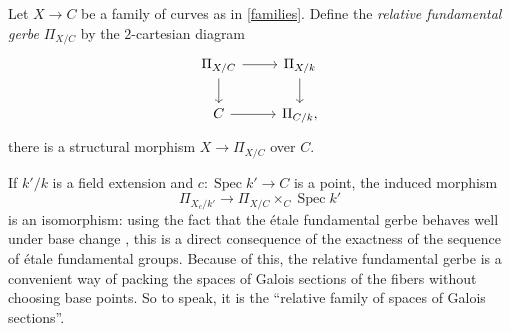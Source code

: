 \documentclass[11pt]{amsart}
\theoremstyle{plain}
\theoremstyle{definition}
\newcommand{\on}{\operatorname}
\newcommand{\1}{\mathbb{1}}
\newcommand{\spec}{\on{Spec}}
\renewcommand{\projlim}{\varprojlim}
\begin{document}

    

    


Let $X\to C$ be a family of curves as in \autoref{families}. Define the \emph{relative fundamental gerbe} $\Pi_{X/C}$ by the $2$-cartesian diagram
\[\begin{tikzcd}
	\Pi_{X/C}\rar\dar	& 	\Pi_{X/k}\dar	\\
	C\rar				&	\Pi_{C/k},
\end{tikzcd}\]
there is a structural morphism $X\to\Pi_{X/C}$ over $C$.



If $k'/k$ is a field extension and $c:\spec k'\to C$ is a point, the induced morphism 
\[\Pi_{X_{c}/k'}\to\Pi_{X/C}\times_{C}\spec k'\]
is an isomorphism: using the fact that the étale fundamental gerbe behaves well under base change \cite[Proposition A.18]{anab}, this is a direct consequence of the exactness of the sequence of étale fundamental groups. Because of this, the relative fundamental gerbe is a convenient way of packing the spaces of Galois sections of the fibers without choosing base points. So to speak, it is the ``relative family of spaces of Galois sections''.
\end{document}
